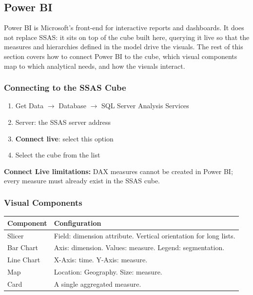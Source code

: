 \subsection{Power BI}
\label{sec:powerbi}

Power BI is Microsoft's front-end for interactive reports and dashboards. It does not replace SSAS: it sits on top of the cube built here, querying it live so that the measures and hierarchies defined in the model drive the visuals. The rest of this section covers how to connect Power BI to the cube, which visual components map to which analytical needs, and how the visuals interact.

\subsubsection{Connecting to the SSAS Cube}
\label{subsec:powerbi-connection}

\begin{enumerate}
    \item Get Data $\to$ Database $\to$ SQL Server Analysis Services
    \item Server: the SSAS server address
    \item \textbf{Connect live}: select this option
    \item Select the cube from the list
\end{enumerate}

\begin{notebox}
\textbf{Connect Live limitations:} DAX measures cannot be created in Power BI; every measure must already exist in the SSAS cube.
\end{notebox}

\subsubsection{Visual Components}
\label{subsec:powerbi-visuals}

\begin{center}
\small
\begin{tabular}{@{}lp{6cm}@{}}
\toprule
\textbf{Component} & \textbf{Configuration} \\
\midrule
Slicer & Field: dimension attribute. Vertical orientation for long lists. \\
Bar Chart & Axis: dimension. Values: measure. Legend: segmentation. \\
Line Chart & X-Axis: time. Y-Axis: measure. \\
Map & Location: Geography. Size: measure. \\
Card & A single aggregated measure. \\
\bottomrule
\end{tabular}
\end{center}

